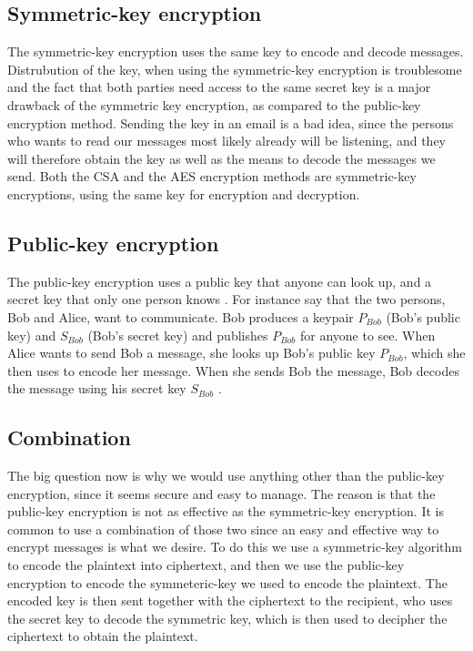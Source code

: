 \subsection{Symmetric-key encryption}\label{ch:symmetric}
The symmetric-key encryption uses the same key to encode and decode 
messages. Distrubution of the key, when using the symmetric-key 
encryption is troublesome and the fact that both parties need access to 
the same secret key is a major drawback of the symmetric key 
encryption, as compared to the public-key encryption method. Sending 
the key in an email is a bad idea, since the persons who wants to read 
our messages most likely already will be listening, and they will 
therefore obtain the key as well as the means to decode the messages we 
send. Both the CSA and the AES encryption methods are symmetric-key 
encryptions, using the same key for encryption and decryption.

\subsection{Public-key encryption}\label{ch:public}
The public-key encryption uses a public key that anyone can look up, 
and a secret key that only one person knows 
\citep[pp. 25--32]{Simmons:1992}. For instance say that the two 
persons, Bob and Alice, want to communicate. Bob produces a keypair 
\(P_{Bob}\) (Bob’s public key) and \(S_{Bob}\) (Bob’s secret key) and 
publishes \(P_{Bob}\) for anyone to see. When Alice wants to send Bob a 
message, she looks up Bob’s public key \(P_{Bob}\), which she then uses 
to encode her message. When she sends Bob the message, Bob decodes the 
message using his secret key \(S_{Bob}\) \citep{Schneier:2003}.

\subsection{Combination}
The big question now is why we would use anything other than the 
public-key encryption, since it seems secure and easy to manage. The 
reason is that the public-key encryption is not as effective as the 
symmetric-key encryption. It is common to use a combination of those 
two since an easy and effective way to encrypt messages is what we 
desire. To do this we use a symmetric-key algorithm to encode the 
plaintext into ciphertext, and then we use the public-key encryption to 
encode the symmeteric-key we used to encode the plaintext. The encoded 
key is then sent together with the ciphertext to the recipient, who 
uses the secret key to decode the symmetric key, which is then used 
to decipher the ciphertext to obtain the plaintext.

